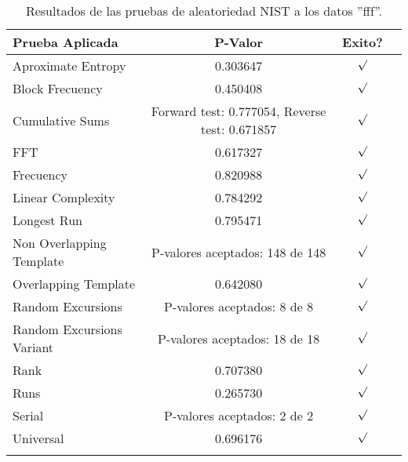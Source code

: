 \documentclass{article}
\begin{document}
 

\onecolumn
{}





\vskip 0.3in





 

\begin{table}[!h]
\caption{Resultados de las pruebas de aleatoriedad NIST a los datos ''fff''.}
\label{sample-table}
\vskip 0.15in
\begin{center}
\begin{small}
\begin{sc}
\begin{tabular}{lccr}
\hline
\abovespace\belowspace
Prueba Aplicada &  P-Valor & Exito? \\
\hline
\abovespace
Aproximate Entropy    &  0.303647   & $\surd$ \\
\abovespace
Block Frecuency  &  0.450408  &  $\surd$  \\
\abovespace
Cumulative Sums    &   Forward test: 0.777054, Reverse test: 0.671857   & $\surd$ \\
\abovespace
FFT    &   0.617327 &   $\surd$      \\
\abovespace
Frecuency     &  0.820988  &  $\surd$   \\
\abovespace
Linear Complexity      & 0.784292 & $\surd$ \\
\abovespace
Longest Run      &  0.795471 &    $\surd$      \\
\abovespace
Non Overlapping Template      & P-valores aceptados: 148 de 148    &     $\surd$          \\
\abovespace
Overlapping Template      & 0.642080 &        $\surd$       \\
\abovespace
Random Excursions      & P-valores aceptados: 8 de 8  &     $\surd$          \\
\abovespace
Random Excursions Variant & P-valores aceptados: 18 de 18  &    $\surd$        \\
\abovespace
Rank &    0.707380      &       $\surd$      \\
\abovespace
Runs &        0.265730    &     $\surd$        \\
\abovespace
Serial &     P-valores aceptados: 2 de 2     &     $\surd$        \\
\abovespace
Universal &     0.696176  &   $\surd$            \\

\hline
\abovespace


\end{tabular}
\end{sc}
\end{small}
\end{center}
\vskip -0.1in
\end{table}
\end{document}
